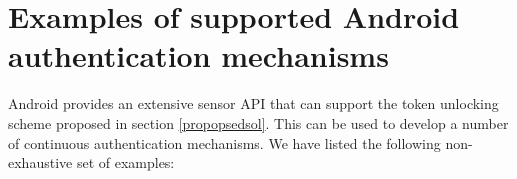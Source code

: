 
\chapter{Examples of supported Android authentication mechanisms} %

\label{AppendixC} %


Android provides an extensive sensor API that can support the token unlocking scheme proposed in section \ref{propopsedsol}. This can be used to develop a number of continuous authentication mechanisms.  We have listed the following non-exhaustive set of examples:

